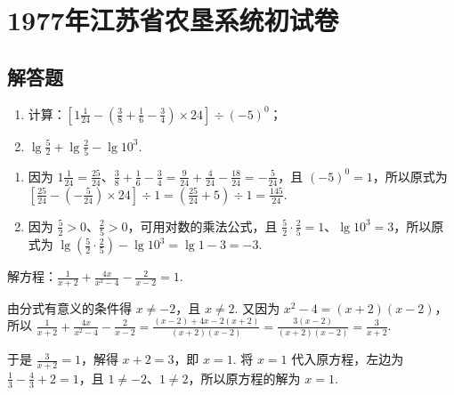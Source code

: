 \chapter{1977年江苏省农垦系统初试卷}

\section{解答题}

\begin{problem}
\begin{enumerate}
\item 计算：\( \left[ 1\frac{1}{24}-\left( \frac{3}{8}+\frac{1}{6}-\frac{3}{4} \right)\times 24 \right]\div (-5)^0 \)；
\item \( \lg \frac{5}{2}+\lg \frac{2}{5}-\lg 10^3 \).
\end{enumerate}
\end{problem}

\begin{solution}
\begin{enumerate}
\item 因为 \(1\frac{1}{24}=\frac{25}{24}\)、\(\frac{3}{8}+\frac{1}{6}-\frac{3}{4}=\frac{9}{24}+\frac{4}{24}-\frac{18}{24}=-\frac{5}{24}\)，且 \((-5)^0=1\)，所以原式为 \(\left[\frac{25}{24}-\left(-\frac{5}{24}\right)\times24\right]\div1=\left(\frac{25}{24}+5\right)\div1=\frac{145}{24}\).

\item 因为 \(\frac{5}{2}>0\)、\(\frac{2}{5}>0\)，可用对数的乘法公式，且 \(\frac{5}{2}\cdot\frac{2}{5}=1\)、\(\lg10^3=3\)，所以原式为 \(\lg\left(\frac{5}{2}\cdot\frac{2}{5}\right)-\lg10^3=\lg1-3=-3\).
\end{enumerate}
\end{solution}

\begin{problem}
解方程：\( \frac{1}{x+2}+\frac{4x}{x^2-4}-\frac{2}{x-2}=1 \).
\end{problem}

\begin{solution}
由分式有意义的条件得 \(x\ne-2\)，且 \(x\ne2\). 又因为 \(x^2-4=(x+2)(x-2)\)，所以 \(\frac{1}{x+2}+\frac{4x}{x^2-4}-\frac{2}{x-2}=\frac{(x-2)+4x-2(x+2)}{(x+2)(x-2)}=\frac{3(x-2)}{(x+2)(x-2)}=\frac{3}{x+2}\).

于是 \(\frac{3}{x+2}=1\)，解得 \(x+2=3\)，即 \(x=1\). 将 \(x=1\) 代入原方程，左边为 \(\frac13-\frac43+2=1\)，且 \(1\ne-2\)、\(1\ne2\)，所以原方程的解为 \(x=1\).
\end{solution}

